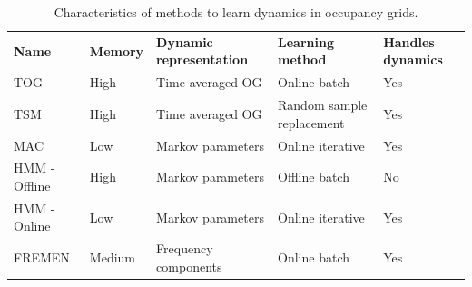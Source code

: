 \begin{table}[htbp]
	\centering
	\caption{Characteristics of methods to learn dynamics in occupancy grids.}
	\label{tab:learners_characteristics}
	\begin{tabular}{p{2.6cm} | p{1.6cm} | p{} | p{2.6cm} | p{1.6cm}}
		\toprule
		\textbf{Name} & \textbf{Memory} & \textbf{Dynamic representation} & \textbf{Learning method} & \textbf{Handles dynamics} \\
		\rowcolor[gray]{0.925}
		TOG & High & Time averaged OG & Online batch & Yes \\
		TSM & High & Time  averaged OG & Random sample replacement  & Yes\\
		\rowcolor[gray]{0.925}
		MAC & Low & Markov parameters & Online iterative & Yes \\
		HMM - Offline & High & Markov parameters & Offline batch  & No \\
		\rowcolor[gray]{0.925} 
		HMM - Online & Low & Markov parameters & Online iterative & Yes \\
		FREMEN & Medium & Frequency components & Online batch & Yes\\
		\bottomrule
	\end{tabular}
\end{table}